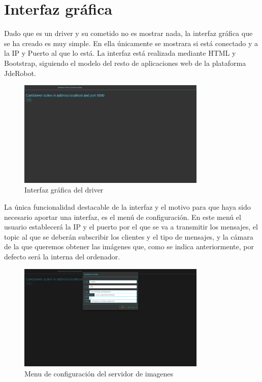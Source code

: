 \section{Interfaz gráfica}
Dado que es un driver y su cometido no es mostrar nada, la interfaz gráfica que se ha creado es muy simple. En ella únicamente se mostrara si está conectado y a la IP y Puerto al que lo está. 
La interfaz está realizada mediante HTML y Bootstrap, siguiendo el modelo del resto de aplicaciones web de la plataforma JdeRobot.
\begin{figure}[H]
  \begin{center}
    \includegraphics[width=0.8\textwidth]{figures/interfazcamserver.png}
		\caption{Interfaz gráfica del driver}
		\label{fig.interfazcamserver}
		\end{center}
\end{figure}
La única funcionalidad destacable de la interfaz y el motivo para que haya sido necesario aportar una interfaz, es el menú de configuración. En este menú el usuario establecerá la IP y el puerto por el que se va a transmitir los mensajes, el topic al que se deberán subscribir los clientes y el tipo de mensajes, y la cámara de la que queremos obtener las imágenes que, como se indica anteriormente, por defecto será la interna del ordenador.
 \begin{figure}[H]
  \begin{center}
    \includegraphics[width=0.8\textwidth]{figures/configcamserver.png}
		\caption{Menu de configuración del servidor de imagenes}
		\label{fig.configcamserver}
		\end{center}
\end{figure}

